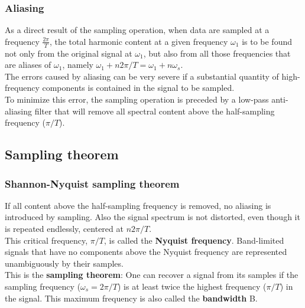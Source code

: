 \begin{frame}
	\frametitle{Aliasing}
	As a direct result of the sampling operation, when data are sampled at a frequency $\frac{2\pi}{T}$, the total harmonic content at a given frequency $\omega_1$ is to be found not only from the original signal at $\omega_1$, but also from all those frequencies that are aliases of $\omega_1$, namely $\omega_1 + n2\pi/T = \omega_1+n\omega_s$.\\
	\medskip
	The errors caused by aliasing can be very severe if a substantial quantity of high-frequency components is contained in the signal to be sampled.\\
	\medskip
	To minimize this error, the sampling operation is preceded by a low-pass anti-aliasing filter that will remove all spectral content above the half-sampling frequency ($\pi/T$).
\end{frame}

\subsection{Sampling theorem}

\begin{frame}
	\frametitle{Shannon-Nyquist sampling theorem}
	If all content above the half-sampling frequency is removed, no aliasing is introduced by sampling. Also the signal spectrum is not distorted, even though it is repeated endlessly, centered at $n2\pi/T$.\\
	\medskip
	This critical frequency, $\pi/T$, is called the \textbf{Nyquist frequency}. Band-limited signals that have no components above the Nyquist frequency are represented unambiguously by their samples. \\
	\medskip
	This is the \textbf{sampling theorem}: One can recover a signal from its samples if the sampling frequency ($\omega_s=2\pi/T$) is at least twice the highest frequency ($\pi/T$) in the signal. This maximum frequency is also called the \textbf{bandwidth} B.
\end{frame}

